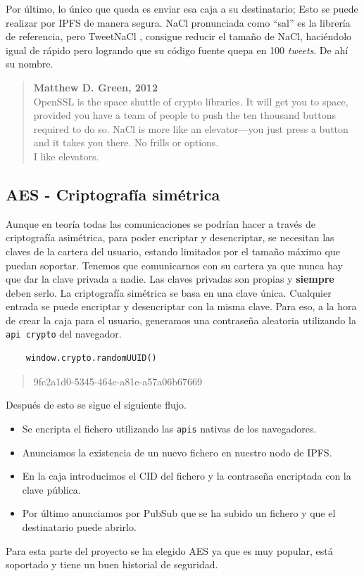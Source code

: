 Por último, lo único que queda es enviar esa caja a su destinatario; Esto se puede realizar por IPFS de manera segura.
NaCl pronunciada como ``sal'' es la librería de referencia, pero TweetNaCl \cite{web:tweetnacl}, consigue reducir el tamaño de NaCl, haciéndolo igual de rápido pero logrando que su código fuente quepa en 100 \textit{tweets}. De ahí su nombre.
\begin{quote}
    \textbf{Matthew D. Green, 2012}\\
    OpenSSL is the space shuttle of crypto libraries. It will get you to space, provided you have a team of people to push the ten thousand buttons required to do so. NaCl is more like an elevator—you just press a button and it takes you there. No frills or options.\\
    I like elevators. \cite{web:tweetnacl_elevator}
\end{quote}
\subsection{AES - Criptografía simétrica}
Aunque en teoría todas las comunicaciones se podrían hacer a través de criptografía asimétrica, para poder encriptar y desencriptar, se necesitan las claves de la cartera del usuario, estando limitados por el tamaño máximo que puedan soportar. Tenemos que comunicarnos con su cartera ya que nunca hay que dar la clave privada a nadie. Las claves privadas son propias y \textbf{siempre} deben serlo.
La criptografía simétrica se basa en una clave única. Cualquier entrada se puede encriptar y desencriptar con la misma clave. Para eso, a la hora de crear la caja para el usuario, generamos una contraseña aleatoria utilizando la \verb|api crypto| del navegador.
\begin{lstlisting}
    window.crypto.randomUUID()
\end{lstlisting}
\begin{quote}
    9fc2a1d0-5345-464c-a81e-a57a06b67669
\end{quote}
Después de esto se sigue el siguiente flujo.
\begin{itemize}
    \item Se encripta el fichero utilizando las \verb|apis| nativas de los navegadores.
    \item Anunciamos la existencia de un nuevo fichero en nuestro nodo de IPFS.
    \item En la caja introducimos el CID del fichero y la contraseña encriptada con la clave pública.
    \item Por último anunciamos por PubSub que se ha subido un fichero y que el destinatario puede abrirlo.
\end{itemize}
Para esta parte del proyecto se ha elegido AES ya que es muy popular, está soportado y tiene un buen historial de seguridad.
\newpage
\thispagestyle{empty}